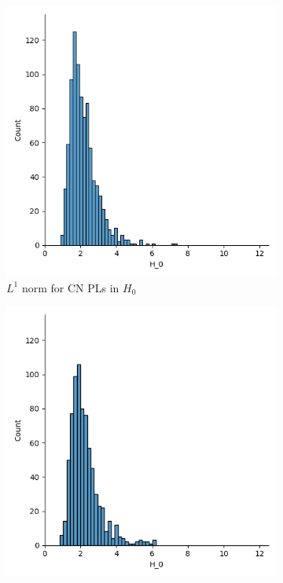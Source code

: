 \documentclass{article}
\begin{document}
\begin{figure}
  \centering
  \begin{subfigure}{0.32\textwidth}
    \includegraphics[width=\textwidth]{figures/median_pls/median_pl_CN_H_0.png}
    \caption{$L^1$ norm for CN PLs in $H_0$}
  \end{subfigure}
  \begin{subfigure}{0.32\textwidth}
    \includegraphics[width=\textwidth]{figures/median_pls/median_pl_MCI_H_0.png}

\end{subfigure}
\end{figure}
\end{document}
